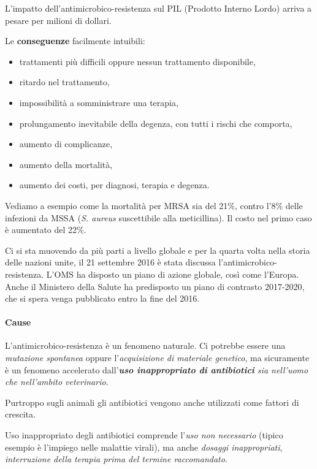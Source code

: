 L'impatto dell'antimicrobico-resistenza sul PIL (Prodotto Interno Lordo)
arriva a pesare per milioni di dollari.

Le \textbf{conseguenze} facilmente intuibili:

\begin{itemize}
\item
  trattamenti più difficili oppure nessun trattamento disponibile,
\item
  ritardo nel trattamento,
\item
  impossibilità a somministrare una terapia,
\item
  prolungamento inevitabile della degenza, con tutti i rischi che
  comporta,
\item
  aumento di complicanze,
\item
  aumento della mortalità,
\item
  aumento dei costi, per diagnosi, terapia e degenza.
\end{itemize}

Vediamo a esempio come la mortalità per MRSA sia del 21\%, contro l'8\%
delle infezioni da MSSA (\emph{S. aureus} suscettibile alla
meticillina). Il costo nel primo caso è aumentato del 22\%.

Ci si sta muovendo da più parti a livello globale e per la quarta volta
nella storia delle nazioni unite, il 21 settembre 2016 è stata discussa
l'antimicrobico-resistenza. L'OMS ha disposto un piano di azione
globale, così come l'Europa. Anche il Ministero della Salute ha
predisposto un piano di contrasto 2017-2020, che si spera venga
pubblicato entro la fine del 2016.

\paragraph{Cause}

L'antimicrobico-resistenza è un fenomeno naturale. Ci potrebbe essere
una \emph{mutazione spontanea} oppure l'\emph{acquisizione di materiale
genetico}, ma sicuramente è un fenomeno accelerato
dall'\emph{\textbf{uso inappropriato di antibiotici} sia nell'uomo che
nell'ambito veterinario}.

Purtroppo sugli animali gli antibiotici vengono anche utilizzati come
fattori di crescita.

Uso inappropriato degli antibiotici comprende l'\emph{uso non
necessario} (tipico esempio è l'impiego nelle malattie virali), ma anche
\emph{dosaggi inappropriati}, \emph{interruzione della terapia prima del
termine raccomandato}.

